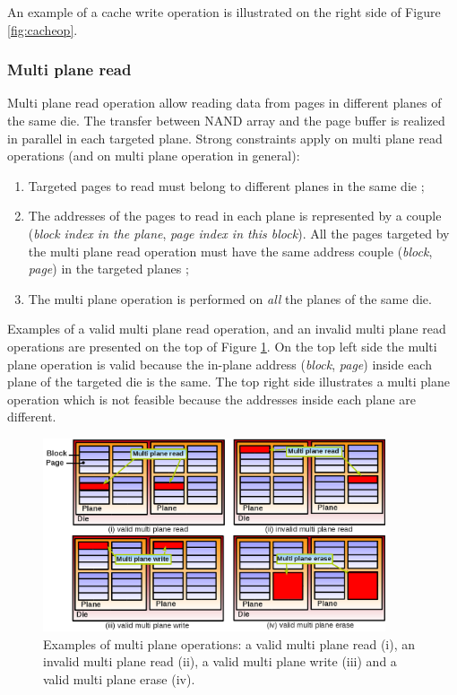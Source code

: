 An example of a cache write operation is illustrated on the right side of Figure \ref{fig:cacheop}.

\subsubsection{Multi plane read}

Multi plane read operation allow reading data from pages in different planes of the same die. The transfer between NAND array and the page buffer is realized in parallel in each targeted plane. Strong constraints apply on multi plane read operations (and on multi plane operation in general):

\begin{enumerate}
  \item Targeted pages to read must belong to different planes in the same die ;
  \item The addresses of the pages to read in each plane is represented by a couple (\emph{block index in the plane}, \emph{page index in this block}). All the pages targeted by the multi plane read operation must have the same address couple (\emph{block}, \emph{page}) in the targeted planes ;
  \item The multi plane operation is performed on \emph{all} the planes of the same die.
\end{enumerate}

Examples of a valid multi plane read operation, and an invalid multi plane read operations are presented on the top of Figure \ref{fig:multiplaneop}. On the top left side the multi plane operation is valid because the in-plane address (\emph{block}, \emph{page}) inside each plane of the targeted die is the same. The top right side illustrates a multi plane operation which is not feasible because the addresses inside each plane are different.

\begin{figure}
  \center
  \includegraphics[width=0.9\textwidth]{Includes/MultiPlaneOp.png}
  \caption{Examples of multi plane operations: a valid multi plane read (i), an invalid multi plane read (ii), a valid multi plane write (iii) and a valid multi plane erase (iv).}
  \label{fig:multiplaneop}
\end{figure}

